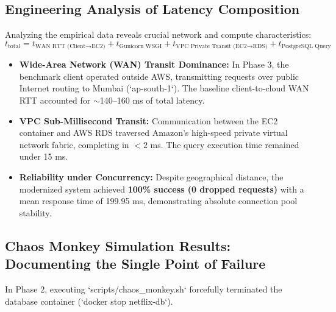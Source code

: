 \documentclass[11pt,a4paper]{article}
\begin{document}
\subsection{Engineering Analysis of Latency Composition}
Analyzing the empirical data reveals crucial network and compute characteristics:
\begin{equation}
    t_{\text{total}} = t_{\text{WAN RTT (Client}\rightarrow\text{EC2)}} + t_{\text{Gunicorn WSGI}} + t_{\text{VPC Private Transit (EC2}\rightarrow\text{RDS)}} + t_{\text{PostgreSQL Query}}
\end{equation}
\begin{itemize}[leftmargin=*]
    \item \textbf{Wide-Area Network (WAN) Transit Dominance:} In Phase 3, the benchmark client operated outside AWS, transmitting requests over public Internet routing to Mumbai (`ap-south-1`). The baseline client-to-cloud WAN RTT accounted for $\sim$140--160 ms of total latency.
    \item \textbf{VPC Sub-Millisecond Transit:} Communication between the EC2 container and AWS RDS traversed Amazon's high-speed private virtual network fabric, completing in $<2$ ms. The query execution time remained under 15 ms.
    \item \textbf{Reliability under Concurrency:} Despite geographical distance, the modernized system achieved \textbf{100\% success (0 dropped requests)} with a mean response time of 199.95 ms, demonstrating absolute connection pool stability.
\end{itemize}

\subsection{Chaos Monkey Simulation Results: Documenting the Single Point of Failure}
In Phase 2, executing `scripts/chaos_monkey.sh` forcefully terminated the database container (`docker stop netflix-db`).
\end{document}
